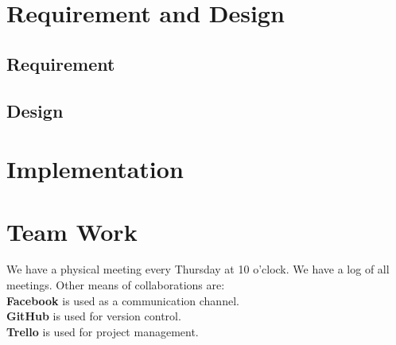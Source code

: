 \documentclass[11pt]{article}
\begin{document}
\section{Requirement and Design}
	\subsection{Requirement}
	\subsection{Design}
	
\newpage
\section{Implementation}

\newpage
\section{Team Work}
We have a physical meeting every Thursday at 10 o'clock. We have a log of all meetings. Other means of collaborations are:
\newline \\
\textbf{Facebook} is used as a communication channel. \\
\textbf{GitHub} is used for version control. \\
\textbf{Trello} is used for project management.

\newpage
\end{document}
